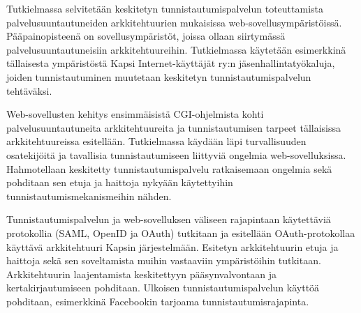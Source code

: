 Tutkielmassa selvitetään keskitetyn tunnistautumispalvelun toteuttamista palvelusuuntautuneiden arkkitehtuurien mukaisissa web-sovellusympäristöissä. Pääpainopisteenä on sovellusympäristöt, joissa ollaan siirtymässä palvelusuuntautuneisiin arkkitehtuureihin. Tutkielmassa käytetään esimerkkinä tällaisesta ympäristöstä Kapsi Internet-käyttäjät ry:n jäsenhallintatyökaluja, joiden tunnistautuminen muutetaan keskitetyn tunnistautumispalvelun tehtäväksi.

Web-sovellusten kehitys ensimmäisistä CGI-ohjelmista kohti palvelusuuntautuneita arkkitehtuureita ja tunnistautumisen tarpeet tällaisissa arkkitehtuureissa esitellään. Tutkielmassa käydään läpi turvallisuuden osatekijöitä ja tavallisia tunnistautumiseen liittyviä ongelmia web-sovelluksissa. Hahmotellaan keskitetty tunnistautumispalvelu ratkaisemaan ongelmia sekä pohditaan sen etuja ja haittoja nykyään käytettyihin tunnistautumismekanismeihin nähden.

Tunnistautumispalvelun ja web-sovelluksen väliseen rajapintaan käytettäviä protokollia (SAML, OpenID ja OAuth) tutkitaan ja esitellään OAuth-protokollaa käyttävä arkkitehtuuri Kapsin järjestelmään. Esitetyn arkkitehtuurin etuja ja haittoja sekä sen soveltamista muihin vastaaviin ympäristöihin tutkitaan. Arkkitehtuurin laajentamista keskitettyyn pääsynvalvontaan ja kertakirjautumiseen pohditaan. Ulkoisen tunnistautumispalvelun käyttöä pohditaan, esimerkkinä Facebookin tarjoama tunnistautumisrajapinta.